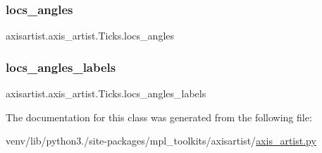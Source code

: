 \subsubsection{\texorpdfstring{locs\+\_\+angles}{locs\_angles}}
{\footnotesize\ttfamily axisartist.\+axis\+\_\+artist.\+Ticks.\+locs\+\_\+angles}

\mbox{\label{classaxisartist_1_1axis__artist_1_1Ticks_aa98517dce24735f7be0ddd45f38485c0}} 
\subsubsection{\texorpdfstring{locs\+\_\+angles\+\_\+labels}{locs\_angles\_labels}}
{\footnotesize\ttfamily axisartist.\+axis\+\_\+artist.\+Ticks.\+locs\+\_\+angles\+\_\+labels}



The documentation for this class was generated from the following file\+:\begin{DoxyCompactItemize}
\item 
venv/lib/python3./site-\/packages/mpl\+\_\+toolkits/axisartist/\hyperlink{axisartist_2axis__artist_8py}{axis\+\_\+artist.\+py}\end{DoxyCompactItemize}
